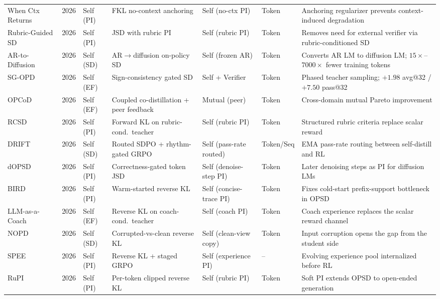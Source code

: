 \documentclass{article} %
\begin{document}
\begin{table}[t]
{\begin{tabular}{@{}lclllll@{}}
        When Ctx Returns~\citep{2606.11627} & 2026 & Self (PI) & FKL no-context anchoring & Self (no-ctx PI) & Token & Anchoring regularizer prevents context-induced degradation \\
        Rubric-Guided SD~\citep{2606.12507} & 2026 & Self (PI) & JSD with rubric PI & Self (rubric PI) & Token & Removes need for external verifier via rubric-conditioned SD \\
        AR-to-Diffusion~\citep{2606.06712} & 2026 & Self (SD) & AR$\to$diffusion on-policy SD & Self (frozen AR) & Token & Converts AR LM to diffusion LM; $15\times$--$7000\times$ fewer training tokens \\
        SG-OPD~\citep{2606.09304} & 2026 & Self (EF) & Sign-consistency gated SD & Self + Verifier & Token & Phased teacher sampling; $+1.98$ avg@32 / $+7.50$ pass@32 \\
        OPCoD~\citep{2606.14368} & 2026 & Self (EF) & Coupled co-distillation + peer feedback & Mutual (peer) & Token & Cross-domain mutual Pareto improvement \\
        RCSD~\citep{2606.19327} & 2026 & Self (PI) & Forward KL on rubric-cond.\ teacher & Self (rubric PI) & Token & Structured rubric criteria replace scalar reward \\
        DRIFT~\citep{2606.30345} & 2026 & Self (SD) & Routed SDPO + rhythm-gated GRPO & Self (pass-rate routed) & Token/Seq & EMA pass-rate routing between self-distill and RL \\
        dOPSD~\citep{2607.04428} & 2026 & Self (PI) & Correctness-gated token JSD & Self (denoise-step PI) & Token & Later denoising steps as PI for diffusion LMs \\
        BIRD~\citep{2607.15736} & 2026 & Self (PI) & Warm-started reverse KL & Self (concise-trace PI) & Token & Fixes cold-start prefix-support bottleneck in OPSD \\
        LLM-as-a-Coach~\citep{2607.18110} & 2026 & Self (EF) & Reverse KL on coach-cond.\ teacher & Self (coach PI) & Token & Coach experience replaces the scalar reward channel \\
        NOPD~\citep{2607.23125} & 2026 & Self (SD) & Corrupted-vs-clean reverse KL & Self (clean-view copy) & Token & Input corruption opens the gap from the student side \\
        SPEE~\citep{2608.02139} & 2026 & Self (PI) & Reverse KL + staged GRPO & Self (experience PI) & -- & Evolving experience pool internalized before RL \\
        RuPI~\citep{2608.02948} & 2026 & Self (PI) & Per-token clipped reverse KL & Self (rubric PI) & Token & Soft PI extends OPSD to open-ended generation \\

\end{tabular}}
\end{table}
\end{document}
